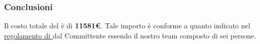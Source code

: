 		\newpage
		
		\subsubsection{Conclusioni}
		Il costo totale del  è di \textbf{11581\euro}. Tale importo è conforme a quanto indicato nel \href{http://www.math.unipd.it/~tullio/IS-1/2015/Progetto/}{regolamento di } dal Committente essendo il nostro team composto di sei persone. 
	
	
